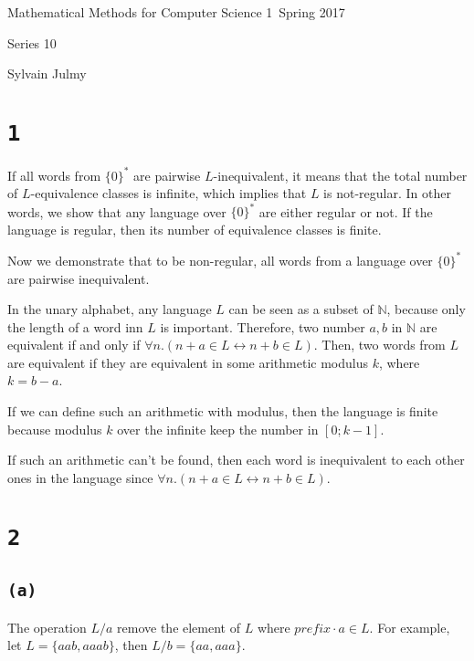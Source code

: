\documentclass[a4paper,11pt]{report}
\author{Sylvain Julmy}
\date{\today}
\begin{document}
\begin{center}
  \Large{
    Mathematical Methods for Computer Science 1\
    Spring 2017
  }
  \noindent\makebox[\linewidth]{\rule{\linewidth}{0.4pt}}

  Series 10
  \vspace*{1.4cm}

  Sylvain Julmy
  
  \noindent\makebox[\linewidth]{\rule{\linewidth}{0.4pt}}
\end{center}

\section*{\texttt{1}}

If all words from $\{0\}^*$ are pairwise $L$-inequivalent, it means that the
total number of $L$-equivalence classes is infinite, which implies that $L$ is
not-regular. In other words, we show that any language over $\{0\}^*$ are either
regular or not. If the language is regular, then its number of equivalence
classes is finite.

Now we demonstrate that to be non-regular, all words from a language over
$\{0\}^*$ are pairwise inequivalent.

In the unary alphabet, any language $L$ can be seen as a subset of
$\mathbb{N}$, because only the length of a word inn $L$ is important. Therefore,
two number $a,b$ in $\mathbb{N}$ are equivalent if and only if $\forall n.(n + a
\in L \leftrightarrow n + b \in L)$. Then, two words from $L$ are equivalent if
they are equivalent in some arithmetic modulus $k$, where $k = b - a$.

If we can define such an arithmetic with modulus, then the language is finite
because modulus $k$ over the infinite keep the number in $[0;k-1]$.

If such an arithmetic can't be found, then each word is inequivalent to each
other ones in the language since $\forall n.(n + a \in L \leftrightarrow n + b
\in L)$.

\section*{\texttt{2}}

\subsection*{\texttt{(a)}}

The operation $L/a$ remove the element of $L$ where $prefix \cdot a \in L$. For
example, let $L = \{aab,aaab\}$, then $L/b = \{aa,aaa\}$.
\end{document}
